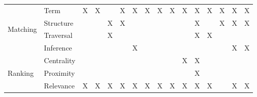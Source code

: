 \begin{table}[htbp]
\begin{tabular}{|r|r||c|c|r|c|c|c|c|c|c|c|c|c|c|r|}
    \hline
    \multicolumn{1}{|l|}{\multirow{4}[8]{*}{Matching}} & \multicolumn{1}{l||}{Term} & X     & X     &       & X     & X     & X     & X     & X     & X     & X     & X     & X     & X     & \multicolumn{1}{c|}{X} \bigstrut\\
\cline{2-16}    \multicolumn{1}{|l|}{} & \multicolumn{1}{l||}{Structure } &       &       & X     & X     &       &       &       &       &       & X     &       & X     & X     & \multicolumn{1}{c|}{X} \bigstrut\\
\cline{2-16}    \multicolumn{1}{|l|}{} & \multicolumn{1}{l||}{Traversal} &       &       & X     &       &       &       &       &       &       & X     & X     &       &       &  \bigstrut\\
\cline{2-16}    \multicolumn{1}{|l|}{} & \multicolumn{1}{l||}{Inference} &       &       &       &       & X     &       &       &       &       &       &       &       & X     & \multicolumn{1}{c|}{X} \bigstrut\\
    \hline
    \multicolumn{1}{|l|}{\multirow{3}[6]{*}{Ranking}} & \multicolumn{1}{l||}{Centrality} &       &       &       &       &       &       &       &       & X     & X     &       &       &       &  \bigstrut\\
\cline{2-16}    \multicolumn{1}{|l|}{} & \multicolumn{1}{l||}{Proximity} &       &       &       &       &       &       &       &       &       & X     &       &       &       &  \bigstrut\\
\cline{2-16}    \multicolumn{1}{|l|}{} & \multicolumn{1}{l||}{Relevance} & X     & X     & X     & X     & X     & X     & X     & X     & X     & X     & X     &       & X     & \multicolumn{1}{c|}{X} \bigstrut\\
    \hline
    \end{tabular}%
  	\label{tab:examples}%
  	\vspace{-0.5cm}
\end{table}%
